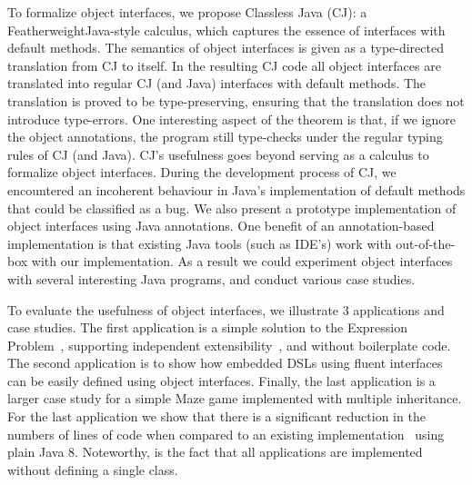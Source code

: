 To formalize object interfaces, we propose Classless Java (CJ): 
a FeatherweightJava-style calculus, which captures the essence 
of interfaces with default methods. The semantics of object interfaces 
is given as a type-directed translation from CJ to itself. 
In the resulting CJ code all object interfaces are translated into 
regular CJ (and Java) interfaces with default methods. The translation 
is proved to be type-preserving, ensuring that the translation does 
not introduce type-errors. One interesting aspect of the theorem is that, 
if we ignore the object annotations, the program still type-checks 
under the regular typing rules of CJ (and Java).
CJ's usefulness goes beyond serving as a calculus to formalize object
interfaces. During the development process of CJ, we encountered an 
incoherent behaviour in Java's implementation of default methods that 
could be classified as a bug. 
We also present a prototype implementation of object interfaces using
Java annotations. One benefit of an annotation-based implementation 
is that existing Java tools (such as IDE's) work with out-of-the-box
with our implementation. As a result we could experiment object
interfaces with several interesting Java programs, and conduct various
case studies. 


To evaluate the usefulness of object interfaces, we illustrate 3
applications and case studies. The first application is a simple 
solution to the Expression Problem~\cite{}, supporting independent 
extensibility~\cite{}, and without boilerplate code. The second
application is to show how embedded DSLs using fluent interfaces~\cite{} 
can be easily defined using object interfaces. Finally, the last
application is a larger case study for a simple Maze game implemented with 
multiple inheritance. For the last application we show that there is a
significant reduction in the numbers of lines of code when compared 
to an existing implementation~\cite{} using plain Java 8. 
Noteworthy, is the fact that all applications are implemented 
without defining a single class.

